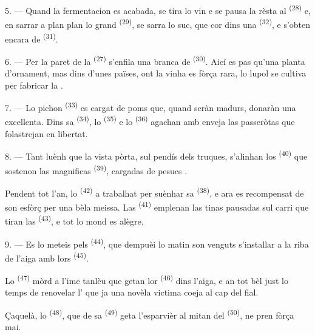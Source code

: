 5. --- Quand la fermentacion es acabada, se tira lo vin e se pausa la rèsta al
 \textsuperscript{(28)} e, en sarrar a plan plan lo grand
 \textsuperscript{(29)}, se sarra lo suc, que cor dins una
 \textsuperscript{(32)}, e s'obten encara de 
\textsuperscript{(31)}.

\VUsaut{6.0mm}
\VUsaut{3.4mm}

6. --- Per la paret de la  \textsuperscript{(27)} s'enfila una branca
de  \textsuperscript{(30)}. Aicí es pas qu'una planta d'ornament, mas
dins d'unes païses, ont la vinha es fòrça rara, lo lupol se cultiva per fabricar
la .

7. --- Lo pichon  \textsuperscript{(33)} es cargat de poms que,
quand seràn madurs, donaràn una  excellenta. Dins sa 
\textsuperscript{(34)}, lo  \textsuperscript{(35)} e lo
 \textsuperscript{(36)} agachan amb enveja las passeròtas que
folastrejan en libertat.

8. --- Tant luènh que la vista pòrta, sul pendís dels truques, s'alinhan los
 \textsuperscript{(40)} que sostenon las magnificas
 \textsuperscript{(39)}, cargadas de pesucs .

Pendent tot l'an, lo  \textsuperscript{(42)} a trabalhat per
suènhar sa  \textsuperscript{(38)}, e ara es recompensat de son
esfòrç per una bèla meissa. Las  \textsuperscript{(41)}
emplenan las tinas pausadas sul carri que tiran las 
\textsuperscript{(43)}, e tot lo mond es alègre.

\VUsaut{5.0mm}
\VUsaut{3.4mm}

9. --- Es lo meteis pels  \textsuperscript{(44)}, que
dempuèi lo matin son venguts s'installar a la riba de l'aiga amb lors
 \textsuperscript{(45)}.

Lo  \textsuperscript{(47)} mòrd a l'ime tanlèu que getan lor
 \textsuperscript{(46)} dins l'aiga, e an tot bèl just lo temps de
renovelar l' que ja una novèla victima coeja al cap del fial.

Çaquelà, lo  \textsuperscript{(48)}, que de sa
 \textsuperscript{(49)} geta l'esparvièr al mitan del 
\textsuperscript{(50)}, ne pren fòrça mai.

